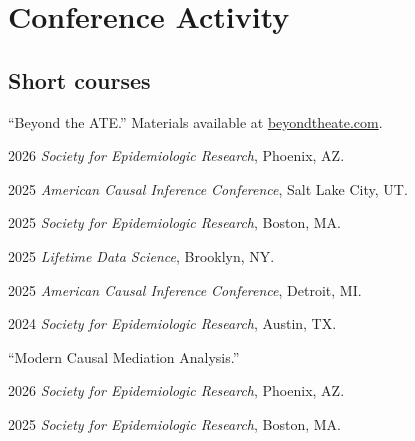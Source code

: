\documentclass[12pt,letterpaper]{report}
\newcommand{\listitemspace}{0.15em}
\renewenvironment{itemize}
{\begin{list}{}{\setlength{\leftmargin}{0em}
            \setlength{\parskip}{0em}
            \setlength{\itemsep}{\listitemspace}
            \setlength{\parsep}{\listitemspace}}}
    {\end{list}}
\begin{document}
    \section*{Conference Activity}
    
    \subsection*{Short courses}
    
     \enquote{Beyond the ATE.} Materials available at \href{https://beyondtheate.com/}{beyondtheate.com}.\\
    
    \begin{itemize}
    
    \item \hspace{1em} 2026 \textit{Society for Epidemiologic Research}, Phoenix, AZ. 
    \item \hspace{1em} 2025 \textit{American Causal Inference Conference}, Salt Lake City, UT. 
    \item \hspace{1em} 2025 \textit{Society for Epidemiologic Research}, Boston, MA. 
    \item \hspace{1em} 2025 \textit{Lifetime Data Science}, Brooklyn, NY. 
    \item \hspace{1em} 2025 \textit{American Causal Inference Conference}, Detroit, MI. 
    \item \hspace{1em} 2024 \textit{Society for Epidemiologic Research}, Austin, TX. 
    
    \end{itemize}
    
    \enquote{Modern Causal Mediation Analysis.} 
    
    \begin{itemize}
    
        \item \hspace{1em} 2026 \textit{Society for Epidemiologic Research}, Phoenix, AZ. 
        \item \hspace{1em} 2025 \textit{Society for Epidemiologic Research}, Boston, MA. 
    
    \end{itemize}
\end{document}
